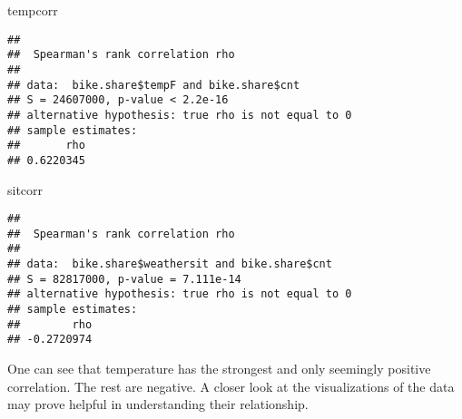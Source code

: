 \documentclass[]{article}
\newenvironment{Shaded}{\begin{snugshade}}{\end{snugshade}}
\newcommand{\KeywordTok}[1]{\textcolor[rgb]{0.13,0.29,0.53}{\textbf{#1}}}
\newcommand{\DataTypeTok}[1]{\textcolor[rgb]{0.13,0.29,0.53}{#1}}
\newcommand{\DecValTok}[1]{\textcolor[rgb]{0.00,0.00,0.81}{#1}}
\newcommand{\StringTok}[1]{\textcolor[rgb]{0.31,0.60,0.02}{#1}}
\newcommand{\CommentTok}[1]{\textcolor[rgb]{0.56,0.35,0.01}{\textit{#1}}}
\newcommand{\OperatorTok}[1]{\textcolor[rgb]{0.81,0.36,0.00}{\textbf{#1}}}
\newcommand{\NormalTok}[1]{#1}
\begin{document}
\begin{Shaded}
\begin{Highlighting}[]
\NormalTok{tempcorr}
\end{Highlighting}
\end{Shaded}

\begin{verbatim}
## 
##  Spearman's rank correlation rho
## 
## data:  bike.share$tempF and bike.share$cnt
## S = 24607000, p-value < 2.2e-16
## alternative hypothesis: true rho is not equal to 0
## sample estimates:
##       rho 
## 0.6220345
\end{verbatim}

\begin{Shaded}
\begin{Highlighting}[]
\NormalTok{sitcorr}
\end{Highlighting}
\end{Shaded}

\begin{verbatim}
## 
##  Spearman's rank correlation rho
## 
## data:  bike.share$weathersit and bike.share$cnt
## S = 82817000, p-value = 7.111e-14
## alternative hypothesis: true rho is not equal to 0
## sample estimates:
##        rho 
## -0.2720974
\end{verbatim}

One can see that temperature has the strongest and only seemingly
positive correlation. The rest are negative. A closer look at the
visualizations of the data may prove helpful in understanding their
relationship.

\begin{Shaded}
\end{Shaded}
\end{document}
